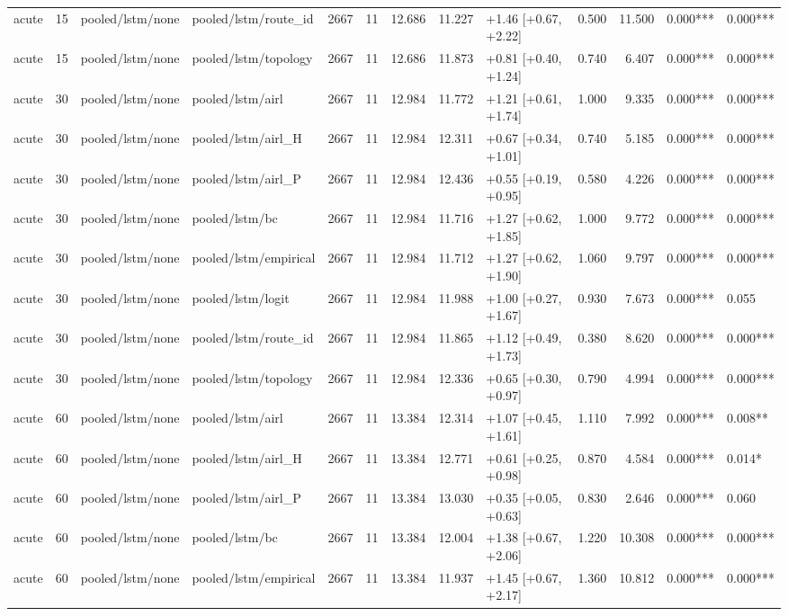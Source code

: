 \begin{tabular}{lrllrrrrlrrll}
acute & 15 & pooled/lstm/none & pooled/lstm/route_id & 2667 & 11 & 12.686 & 11.227 & +1.46 [+0.67, +2.22] & 0.500 & 11.500 & 0.000*** & 0.000*** \\
acute & 15 & pooled/lstm/none & pooled/lstm/topology & 2667 & 11 & 12.686 & 11.873 & +0.81 [+0.40, +1.24] & 0.740 & 6.407 & 0.000*** & 0.000*** \\
acute & 30 & pooled/lstm/none & pooled/lstm/airl & 2667 & 11 & 12.984 & 11.772 & +1.21 [+0.61, +1.74] & 1.000 & 9.335 & 0.000*** & 0.000*** \\
acute & 30 & pooled/lstm/none & pooled/lstm/airl_H & 2667 & 11 & 12.984 & 12.311 & +0.67 [+0.34, +1.01] & 0.740 & 5.185 & 0.000*** & 0.000*** \\
acute & 30 & pooled/lstm/none & pooled/lstm/airl_P & 2667 & 11 & 12.984 & 12.436 & +0.55 [+0.19, +0.95] & 0.580 & 4.226 & 0.000*** & 0.000*** \\
acute & 30 & pooled/lstm/none & pooled/lstm/bc & 2667 & 11 & 12.984 & 11.716 & +1.27 [+0.62, +1.85] & 1.000 & 9.772 & 0.000*** & 0.000*** \\
acute & 30 & pooled/lstm/none & pooled/lstm/empirical & 2667 & 11 & 12.984 & 11.712 & +1.27 [+0.62, +1.90] & 1.060 & 9.797 & 0.000*** & 0.000*** \\
acute & 30 & pooled/lstm/none & pooled/lstm/logit & 2667 & 11 & 12.984 & 11.988 & +1.00 [+0.27, +1.67] & 0.930 & 7.673 & 0.000*** & 0.055 \\
acute & 30 & pooled/lstm/none & pooled/lstm/route_id & 2667 & 11 & 12.984 & 11.865 & +1.12 [+0.49, +1.73] & 0.380 & 8.620 & 0.000*** & 0.000*** \\
acute & 30 & pooled/lstm/none & pooled/lstm/topology & 2667 & 11 & 12.984 & 12.336 & +0.65 [+0.30, +0.97] & 0.790 & 4.994 & 0.000*** & 0.000*** \\
acute & 60 & pooled/lstm/none & pooled/lstm/airl & 2667 & 11 & 13.384 & 12.314 & +1.07 [+0.45, +1.61] & 1.110 & 7.992 & 0.000*** & 0.008** \\
acute & 60 & pooled/lstm/none & pooled/lstm/airl_H & 2667 & 11 & 13.384 & 12.771 & +0.61 [+0.25, +0.98] & 0.870 & 4.584 & 0.000*** & 0.014* \\
acute & 60 & pooled/lstm/none & pooled/lstm/airl_P & 2667 & 11 & 13.384 & 13.030 & +0.35 [+0.05, +0.63] & 0.830 & 2.646 & 0.000*** & 0.060 \\
acute & 60 & pooled/lstm/none & pooled/lstm/bc & 2667 & 11 & 13.384 & 12.004 & +1.38 [+0.67, +2.06] & 1.220 & 10.308 & 0.000*** & 0.000*** \\
acute & 60 & pooled/lstm/none & pooled/lstm/empirical & 2667 & 11 & 13.384 & 11.937 & +1.45 [+0.67, +2.17] & 1.360 & 10.812 & 0.000*** & 0.000*** \\

\end{tabular}
